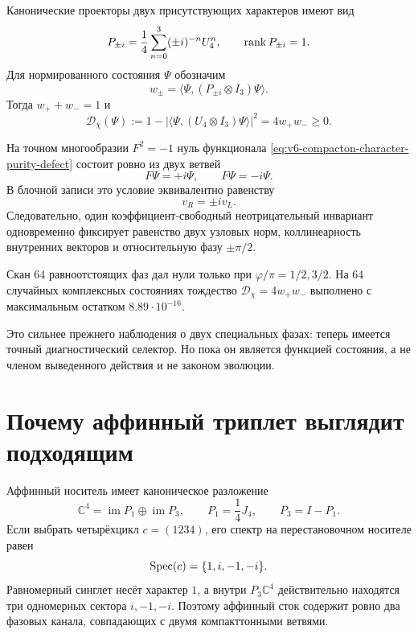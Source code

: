 Канонические проекторы двух присутствующих характеров имеют вид
\begin{equation}
 P_{\pm i}=\frac14\sum_{n=0}^3(\pm i)^{-n}U_4^n,
 \qquad
 \operatorname{rank} P_{\pm i}=1.
 \label{eq:v6-compacton-pm-i-character-projectors}
\end{equation}
Для нормированного состояния $\Psi$ обозначим
\begin{equation}
 w_{\pm}=\langle\Psi,(P_{\pm i}\otimes I_3)\Psi\rangle.
\end{equation}
Тогда $w_++w_-=1$ и
\begin{equation}
 \mathcal D_\chi(\Psi)
 :=1-\left|\langle\Psi,(U_4\otimes I_3)\Psi\rangle\right|^2
 =4w_+w_-\geq0.
 \label{eq:v6-compacton-character-purity-defect}
\end{equation}

\begin{theorem}
На точном многообразии $F^2=-1$ нуль функционала
\eqref{eq:v6-compacton-character-purity-defect} состоит ровно из двух
ветвей
\begin{equation}
 F\Psi=+i\Psi,
 \qquad
 F\Psi=-i\Psi.
\end{equation}
В блочной записи это условие эквивалентно равенству
\begin{equation}
 v_R=\pm i v_L.
\end{equation}
Следовательно, один коэффициент-свободный неотрицательный инвариант
одновременно фиксирует равенство двух узловых норм,
коллинеарность внутренних векторов и относительную фазу $\pm\pi/2$.
\end{theorem}

Скан $64$ равноотстоящих фаз дал нули только при
$\varphi/\pi=1/2,3/2$. На $64$ случайных комплексных состояниях тождество
$\mathcal D_\chi=4w_+w_-$ выполнено с максимальным остатком
$8.89\cdot10^{-16}$.

Это сильнее прежнего наблюдения о двух специальных фазах: теперь имеется
точный диагностический селектор. Но пока он является функцией состояния,
а не членом выведенного действия и не законом эволюции.

\section{Почему аффинный триплет выглядит подходящим}

Аффинный носитель имеет каноническое разложение
\begin{equation}
 \mathbb C^4=\operatorname{im}P_1\oplus\operatorname{im}P_3,
 \qquad
 P_1=\frac14J_4,
 \qquad
 P_3=I-P_1.
\end{equation}
Если выбрать четырёхцикл $c=(1234)$, его спектр на перестановочном
носителе равен
\begin{equation}
 \operatorname{Spec}(c)=\{1,i,-1,-i\}.
\end{equation}
Равномерный синглет несёт характер $1$, а внутри $P_3\mathbb C^4$
действительно находятся три одномерных сектора $i,-1,-i$. Поэтому
аффинный сток содержит ровно два фазовых канала, совпадающих с двумя
компакттонными ветвями.

